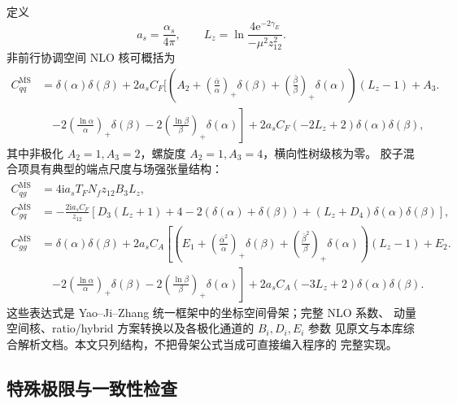 \documentclass[12pt,a4paper]{ctexart}
\theoremstyle{definition}
\newcommand{\MSbar}{\overline{\mathrm{MS}}}
\newcommand{\ii}{\mathrm{i}}
\newcommand{\ee}{\mathrm{e}}
\begin{document}
定义
\begin{equation}
a_s=\frac{\alpha_s}{4\pi},\qquad
L_z=\ln\frac{4\ee^{-2\gamma_E}}{-\mu^2z_{12}^2}.
\label{eq:matching-lz}
\end{equation}
非前行协调空间 NLO 核可概括为
\begin{align}
C_{qq}^{\MSbar}
&=\delta(\alpha)\delta(\beta)
+2a_sC_F\bigg[
\left(A_2+\left(\frac{\bar\alpha}{\alpha}\right)_+\delta(\beta)
+\left(\frac{\bar\beta}{\beta}\right)_+\delta(\alpha)\right)(L_z-1)
+A_3\bigg.\nonumber\\
&\quad\left.
-2\left(\frac{\ln\alpha}{\alpha}\right)_+\delta(\beta)
-2\left(\frac{\ln\beta}{\beta}\right)_+\delta(\alpha)
\right]
+2a_sC_F(-2L_z+2)\delta(\alpha)\delta(\beta),
\label{eq:cqq-nlo}
\end{align}
其中非极化 $A_2=1,A_3=2$，螺旋度 $A_2=1,A_3=4$，横向性树级核为零。
胶子混合项具有典型的端点尺度与场强张量结构：
\begin{align}
C_{qg}^{\MSbar}
&=4\ii a_sT_FN_fz_{12}B_3L_z,\\
C_{gq}^{\MSbar}
&=-\frac{2\ii a_sC_F}{z_{12}}
\left[
D_3(L_z+1)+4-2(\delta(\alpha)+\delta(\beta))
+(L_z+D_4)\delta(\alpha)\delta(\beta)
\right],\\
C_{gg}^{\MSbar}
&=\delta(\alpha)\delta(\beta)
+2a_sC_A\left[
\left(E_1+\left(\frac{\bar\alpha^2}{\alpha}\right)_+\delta(\beta)
+\left(\frac{\bar\beta^2}{\beta}\right)_+\delta(\alpha)\right)(L_z-1)
+E_2\bigg.\right.\nonumber\\
&\quad\left.
-2\left(\frac{\ln\alpha}{\alpha}\right)_+\delta(\beta)
-2\left(\frac{\ln\beta}{\beta}\right)_+\delta(\alpha)
\right]
+2a_sC_A(-3L_z+2)\delta(\alpha)\delta(\beta).
\label{eq:matching-mixing-nlo}
\end{align}
这些表达式是 Yao--Ji--Zhang 统一框架中的坐标空间骨架；完整 NLO 系数、
动量空间核、ratio/hybrid 方案转换以及各极化通道的 $B_i,D_i,E_i$ 参数
见原文与本库综合解析文档。本文只列结构，不把骨架公式当成可直接编入程序的
完整实现。

\subsection{特殊极限与一致性检查}
\end{document}
